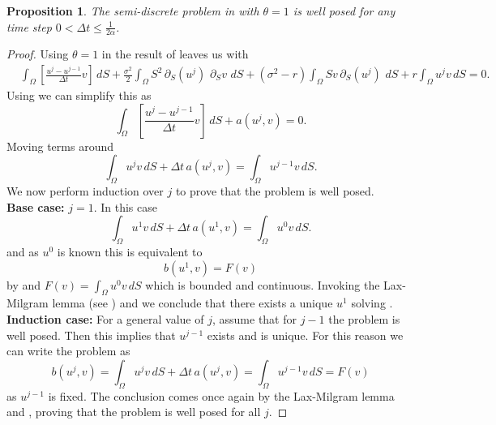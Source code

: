 \documentclass{article}
\newtheorem{prop}[thm]{Proposition}
\newcommand{\argwrapsquare}[1]{\left[#1\right]}
\newcommand{\intS}[1]{\ensuremath{\int_{\Omega}#1 \, dS}}
\newcommand{\intSlong}[1]{\intS{\argwrapsquare{#1}}}
\newcommand{\darg}[2]{\ensuremath{\, \partial_{#2}#1} \, }
\newcommand{\dS}[1]{\ensuremath{\darg{#1}{S}}}
\newcommand{\dSv}{\dS{v}}
\newcommand{\sigmafrac}{\ensuremath{\frac{\sigma^2}{2}}}
\begin{document}
\begin{prop}\label{prop:lax_milgram}
    The semi-discrete problem in  with $\theta = 1$ is well posed for any time step $0<\Delta t \leq \frac{1}{2 \alpha}$.
\end{prop}
\begin{proof}
    Using $\theta = 1$ in the result of  leaves us with
    \begin{align*}
        &\intSlong{\frac{u^{j} - u^{j-1}}{\Delta t}  v} +\sigmafrac \intS{S^2 \dS{\left(u^{j}\right)} \dSv} + (\sigma^2 - r) \intS{S v \dS{\left(u^{j}\right)}} + r \intS{u^{j}v} =0.
        \end{align*}
    Using  we can simplify this as
    \begin{equation*}
    \intSlong{\frac{u^{j} - u^{j-1}}{\Delta t} v} + a(u^{j},v) = 0.
    \end{equation*}
    Moving terms around
    \begin{equation*}
        \intS{u^{j}v} + \Delta t \,a(u^{j},v) = \intS{u^{j-1}v}.
    \end{equation*}
    We now perform induction over $j$ to prove that the problem is well posed.\\
    \textbf{Base case:} $j = 1$. In this case
    \begin{equation*}
        \intS{u^{1}v} + \Delta t \,a(u^{1},v) = \intS{u^{0}v}.
    \end{equation*}
    and as $u^0$ is known this is equivalent to 
    \begin{equation}\label{eq:base_case}
        b(u^{1}, v) = F(v)
    \end{equation}
    by  and $F(v)=\intS{u^{0}v}$ which is bounded and continuous. Invoking the Lax-Milgram lemma (see ) and  we conclude that there exists a unique $u^1$ solving .\\
    \textbf{Induction case: } For a general value of $j$, assume that for $j-1$ the problem is well posed. Then this implies that $u^{j-1}$ exists and is unique. For this reason we can write the problem as
    \begin{equation*}
        b(u^{j},v)=\intS{u^{j}v} + \Delta t \,a(u^{j},v) = \intS{u^{j-1}v} = F(v)
    \end{equation*}
     as $u^{j-1}$ is fixed. The conclusion comes once again by the Lax-Milgram lemma  and , proving that the problem is well posed for all $j$. \qedhere
    
    
\end{proof}
\end{document}
